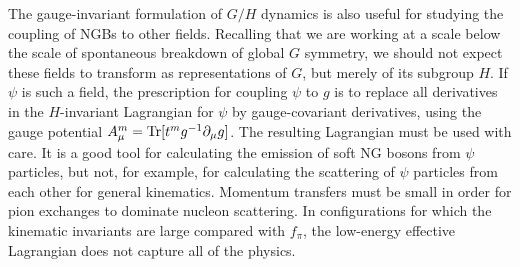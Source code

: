 The gauge-invariant formulation of $G/H$ dynamics is also useful for studying
the coupling of NGBs to other fields. Recalling that we are working at a scale
below the scale of spontaneous breakdown of global $G$ symmetry, we should not
expect these fields to transform as representations of $G$, but merely of its
subgroup $H$. If $\psi$ is such a field, the prescription for coupling $\psi$ to
$g$ is to replace all derivatives in the $H$-invariant Lagrangian for $\psi$ by
gauge-covariant derivatives, using the gauge potential
$A_\mu^m=\operatorname{Tr}[t^m g^{-1}\partial_\mu g]$. The resulting Lagrangian must be used
with care. It is a good tool for calculating the emission of soft NG bosons from
$\psi$ particles, but not, for example, for calculating the scattering of $\psi$
particles from each other for general kinematics. Momentum transfers must be
small in order for pion exchanges to dominate nucleon scattering. In
configurations for which the kinematic invariants are large compared with
$f_\pi$, the low-energy effective Lagrangian does not capture all of the
physics.
